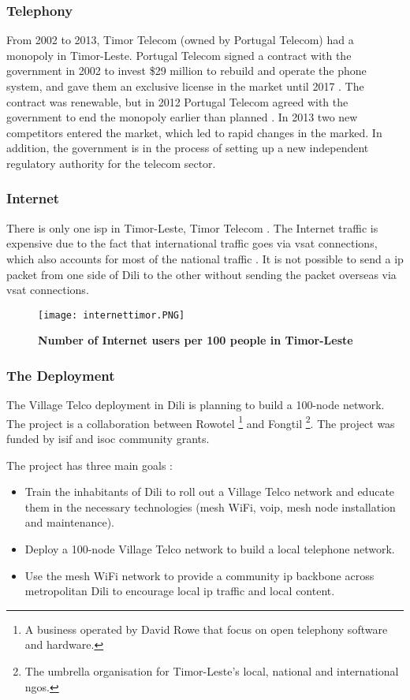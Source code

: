 \subsubsection{Telephony}
From 2002 to 2013, Timor Telecom (owned by Portugal Telecom) had a monopoly in Timor-Leste. Portugal Telecom signed a contract with the government in 2002 to invest \$29 million to rebuild and operate the phone system, and gave them an exclusive license in the market until 2017 \cite{wikitelecomeasttimor}. The contract was renewable, but in 2012 Portugal Telecom agreed with the government to end the monopoly earlier than planned \cite{budde}. In 2013 two new competitors entered the market, which led to rapid changes in the marked. In addition, the government is in the process of setting up a new independent regulatory authority for the telecom sector.

\subsubsection{Internet} There is only one \gls{isp} in Timor-Leste, Timor Telecom \cite{wikitelecomeasttimor}. The Internet traffic is expensive due to the fact that international traffic goes via \gls{vsat} connections, which also accounts for most of the national traffic \cite{vtdili}. It is not possible to send a \gls{ip} packet from one side of Dili to the other without sending the packet overseas via \gls{vsat} connections. 


\begin{figure}[t]
\centering
\texttt{[image: internettimor.PNG]}
\caption[Number of Internet users per 100 people in Timor-Leste]{\textbf{Number of Internet users per 100 people in Timor-Leste}}
\label{fig:internettimor}
\end{figure}

\subsubsection{The Deployment}
The Village Telco deployment in Dili is planning to build a 100-node network. The project is a collaboration between Rowotel \footnote{A business operated by David Rowe that focus on open telephony software and hardware.} and Fongtil \footnote{The umbrella organisation for Timor-Leste’s local, national and international \glspl{ngo}.}. The project was funded by \gls{isif} and \gls{isoc} community grants. 

The project has three main goals \cite{vtdili}:
\begin{itemize}
\item Train the inhabitants of Dili to roll out a Village Telco network and educate them in the necessary technologies (mesh WiFi, \gls{voip}, mesh node installation and maintenance).
\item Deploy a 100-node Village Telco network to build a local telephone network.
\item Use the mesh WiFi network to provide a community \gls{ip} backbone across metropolitan Dili to encourage local \gls{ip} traffic and local content.
\end{itemize}

